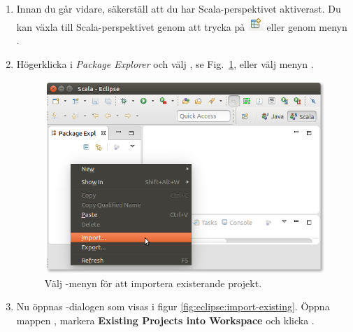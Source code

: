 \begin{enumerate}
\item Innan du går vidare, säkerställ att du har Scala-perspektivet aktiverast. Du kan växla till Scala-perspektivet genom att trycka på \includegraphics[scale=0.75]{../img/eclipse/eclipse-perspective-button.png} eller genom menyn .


\item Högerklicka i \textit{Package Explorer} och välj , se Fig.~\ref{fig:eclipse:import}, eller välj menyn .

\begin{figure}[H]
\centering
\includegraphics[width=1.0\textwidth]{../img/eclipse/eclipse-import.png}
\caption {Välj -menyn för att importera existerande projekt.}
\label{fig:eclipse:import}
\end{figure}

\item Nu öppnas -dialogen som visas i figur \ref{fig:eclipse:import-existing}. Öppna mappen , markera \textbf{Existing Projects into Workspace} och klicka .




\end{enumerate}
